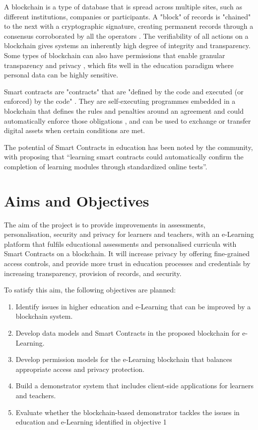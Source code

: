 A blockchain is a type of database that is spread across multiple sites, such as different institutions, companies
or participants. A "block" of records is "chained" to the next with a cryptographic signature, creating permanent records
through a consensus corroborated by all the operators \citep[p.17]{walport2016distributed}.
The verifiability of all actions on a blockchain gives systems an inherently high degree of integrity and transparency.
Some types of blockchain can also have permissions that enable granular transparency and privacy \citep[p.22]{walport2016distributed},
which fits well in the education paradigm where personal data can be highly sensitive.

Smart contracts are "contracts" that are "defined by the code and executed (or enforced) by the code" \citep[p.16]{swan2015blockchain}.
They are self-executing programmes embedded in a blockchain that defines the rules and penalties around an agreement and could automatically enforce
those obligations \citep{gulhane2017ibm}, and can be used to exchange or transfer digital assets when certain conditions are met.

The potential of Smart Contracts in education has been noted by the community, with \citet[p.62]{swan2015blockchain}
proposing that “learning smart contracts could automatically confirm the completion of learning modules through standardized
online tests”.

\section{Aims and Objectives} %

The aim of the project is to provide improvements in assessments, personalisation, security and privacy 
for learners and teachers, with an e-Learning platform that fulfils educational assessments
and personalised curricula with Smart Contracts on a blockchain. It will increase privacy by offering 
fine-grained access controls, and provide more trust in education processes and credentials by 
increasing transparency, provision of records, and security.

To satisfy this aim, the following objectives are planned:
\begin{enumerate}
	\setlength\itemsep{0em}
	\item Identify issues in higher education and e-Learning that can be improved by a blockchain system.
	\item Develop data models and Smart Contracts in the proposed blockchain for e-Learning.
	\item Develop permission models for the e-Learning blockchain that balances appropriate access and privacy protection.
	\item Build a demonstrator system that includes client-side applications for learners and teachers.
	\item Evaluate whether the blockchain-based demonstrator tackles the issues in education and e-Learning identified in objective 1
\end{enumerate}

